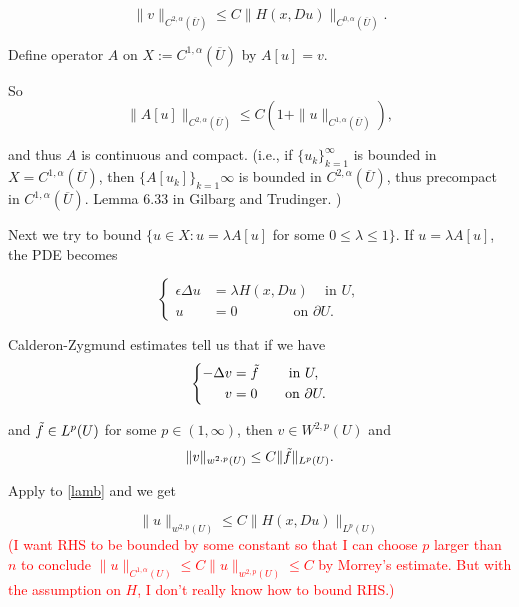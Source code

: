\documentclass[11pt,reqno]{amsart}
\numberwithin{figure}{section}
\theoremstyle{plain}
\theoremstyle{remark}
\numberwithin{equation}{section}
\begin{document}
\begin{appendices}
\begin{equation}
\label{schauder}
    \|v\|_{C^{2, \alpha}(\overline{U})} \leq C  \|H(x, Du)\|_{C^{0, \alpha}(\overline{U})}. 
\end{equation}

Define operator $A$ on $X := C^{1, \alpha} (\overline{U}) $ by $A[u]=v$. 

So 
\begin{equation}
     \|A[u]\|_{C^{2, \alpha}(\overline{U})} \leq C(1 + \|u\|_{C^{1,\alpha}(\overline{U})}),
\end{equation}

 and thus $A$ is continuous and compact. (i.e., if $\{u_k\}_{k=1}^\infty$ is bounded in $X=C^{1, \alpha}(\overline{U})$, then $\{A[u_k]\}_{k=1}\infty$ is bounded in $C^{2,\alpha} (\overline{U})$, thus precompact in $C^{1, \alpha}(\overline{U})$. Lemma 6.33 in Gilbarg and Trudinger. )
 
 Next we try to bound $\{u\in X : u=\lambda A[u]$ for some $0 \leq  \lambda \leq 1\}$.
 If $u=\lambda A[u]$, the PDE becomes
 
\begin{equation}
\label{lamb}
\left\{
  \begin{aligned}
   \epsilon \Delta u &= \lambda H(x, Du) \quad \, \text{in } U, \\
              u &= 0 \qquad \qquad \text{on } \partial U.
  \end{aligned}
\right.
\end{equation}

Calderon-Zygmund estimates tell us that if we have
\begin{equation}
\label{cald}
\left\{
  \begin{aligned}
  - \Delta v &=\Tilde{f}   \qquad \, \text{in } U, \\
              v &= 0 \qquad \text{on } \partial U.
  \end{aligned}
\right.
\end{equation}

and $\Tilde{f} \in {L^p(U)}$ for some $p\in (1, \infty)$, then $v \in W^{2,p}(U)$ and $$\|v\|_{w^{2,p}(U)} \leq C\|\Tilde{f}\|_{L^p(U)}.$$ 

Apply to \eqref{lamb} and we get

\begin{equation}
    \|u\|_{w^{2,p}(U)} \leq C\|H(x, Du)\|_{L^p(U)}
\end{equation}
\textcolor{red}{(I want RHS to be bounded by some constant so that I can choose $p$ larger than $n$ to  conclude $ \|u\|_{C^{1, \alpha}(U)} \leq   C\|u\|_{w^{2,p}(U)} \leq C$ by Morrey's estimate. But with the assumption on $H$, I don't really know how to bound RHS.)}


\end{appendices}
\end{document}
